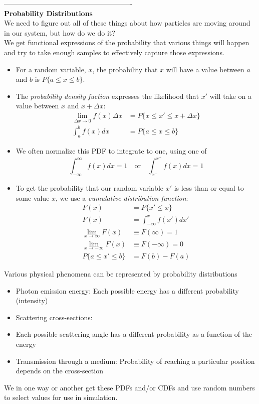 \documentclass[12pt]{article}
\begin{document}
-------------------------------------------------------\\
\textbf{Probability Distributions}\\
We need to figure out all of these things about how particles are moving around in our system, but how do we do it?\\
We get functional expressions of the probability that various things will happen and try to take enough samples to effectively capture those expressions.
%
\begin{itemize}
\item For a random variable, $x$, the probability that $x$ will have a value between $a$ and $b$ is $P\{a \leq x \leq b\}$.
%
\item The \textit{probability density fuction} expresses the likelihood that $x'$ will take on a value between $x$ and $x+\Delta x$:
\begin{align*}
\lim_{\Delta x \to 0} f(x)\Delta x &= P \{ x \leq x' \leq x + \Delta x \}\\
\int_a^b f(x) dx &= P\{a \leq x \leq b\}
\end{align*}
%
\item We often normalize this PDF to integrate to one, using one of
\begin{equation}
\int_{-\infty}^{\infty} f(x) dx = 1 \quad \text{or} \quad
\int_{x^-}^{x^+} f(x) dx = 1 \nonumber
\end{equation}
%
\item To get the probability that our random variable $x'$ is less than or equal to some value $x$, we use a \textit{cumulative distribution function}:
\begin{align*}
F(x) &= P\{x' \leq x\} \\
F(x) &= \int_{-\infty}^{x} f(x') dx' \\
\lim_{x \to \infty} F(x) &\equiv F(\infty) = 1 \\
\lim_{x \to -\infty} F(x) &\equiv F(-\infty) = 0 \\
P \{ a \leq x' \leq b \} &= F(b) - F(a)
\end{align*}
\end{itemize}

Various physical phenomena can be represented by probability distributions
\begin{itemize}
  \item Photon emission energy: Each possible energy has a different probability (intensity)
  \item Scattering cross-sections:
    \item Each possible scattering angle has a different probability as a function of the energy
  \item Transmission through a medium: Probability of reaching a particular position
depends on the cross-section
\end{itemize}
%
We in one way or another get these PDFs and/or CDFs and use random numbers to select values for use in simulation.
\end{document}
